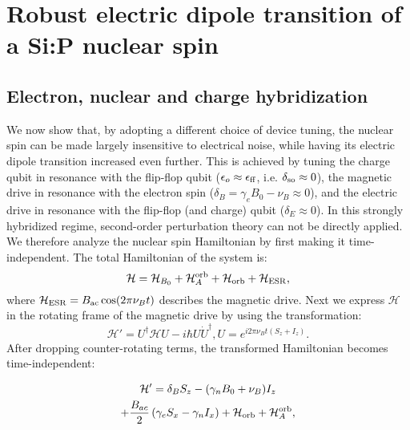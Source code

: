 \documentclass[
 aps,prb,twocolumn,
 amsmath,amssymb,superscriptaddress,
] {revtex4-1}
\begin{document}
\section{Robust electric dipole transition of a Si:P nuclear spin} \label{sec:robust}

\subsection{Electron, nuclear and charge hybridization} 

We now show that, by adopting a different choice of device tuning, the nuclear spin can be made largely insensitive to electrical noise, while having its electric dipole transition increased even further. This is achieved by tuning the charge qubit in resonance with the flip-flop qubit ($\epsilon_o \approx \epsilon_{\rm ff}$, i.e. $\delta_{\rm so}\approx 0$), the magnetic drive in resonance with the electron spin ($\delta_B = \gamma_eB_0-\nu_B\approx 0$), and the electric drive in resonance with the flip-flop (and charge) qubit ($\delta_E \approx 0$). In this strongly hybridized regime, second-order perturbation theory can not be directly applied. We therefore analyze the nuclear spin Hamiltonian by first making it time-independent. The total Hamiltonian of the system is:
\begin{equation}
\mathcal{H} = \mathcal{H}_{B_0} +\mathcal{H}_{A}^{\rm orb} + \mathcal{H}_{\rm orb} + \mathcal{H}_{\rm ESR},
\end{equation}
where $\mathcal{H}_{\rm ESR}=B_{\rm ac}\cos(2\pi\nu_Bt)$ describes the magnetic drive. Next we express $\mathcal{H}$ in the rotating frame of the magnetic drive by using the transformation:
\begin{subequations}
\begin{equation}
\mathcal{H}'=U^\dagger\mathcal{H}U-i\hbar U\dot{U}^\dagger,
\end{equation}
\begin{equation}
U=e^{i2\pi\nu_Bt\left(S_z+I_z\right)}.
\end{equation}
\end{subequations}
After dropping counter-rotating terms, the transformed Hamiltonian becomes time-independent:

\begin{multline} \label{eq:H_nsRot}
\mathcal{H}'=\delta_BS_z-(\gamma_nB_0+\nu_B)I_z\\
+\frac{B_{ac}}{2}\left(\gamma_eS_x-\gamma_nI_x\right)+\mathcal{H}_{\rm orb}+\mathcal{H}_A^{\rm orb},
\end{multline}
\end{document}
